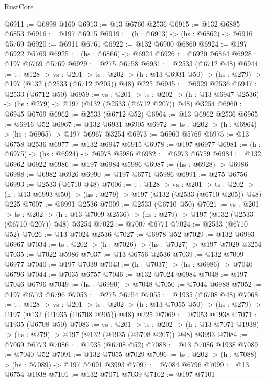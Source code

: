 \begin{lexlean}{RustCore}
\begin{coremodule}
@6911 := @6898 @160
@6913 := @13 @6760 @2536
@6915 := @132 @6885 @6853
@6916 := @197 @6915
@6919 := (h : @6913) -> (hs : @6862) -> @6916 @5769
@6920 := @6911 @6761
@6922 := @132 @6900 @6860
@6924 := @197 @6922 @5769
@6925 := (hs : @6866) -> @6924
@6926 := @6920 @6864
@6928 := @197 @6769 @5769
@6929 := @275 @6758
@6931 := @2533 (@6712 @48)
@6944 := {t : @128} ->
  {vs : @201} ->
  {ts : @202} -> (h : @13 @6931 @50) -> (hs : @279) -> @197 (@132 (@2533 (@6712 @205)) @48) @225
@6945 := @6929 @2536
@6947 := @2533 (@6712 @50)
@6959 := {vs : @201} ->
  {ts : @202} -> (h : @13 @6947 @2536) -> (hs : @279) -> @197 (@132 (@2533 (@6712 @207)) @48) @3254
@6960 := @6945 @6769
@6962 := @2533 (@6712 @52)
@6964 := @13 @6962 @2536
@6965 := @6916 @52
@6967 := @132 @6931 @6905
@6972 := {ts : @202} -> (h : @6964) -> (hs : @6965) -> @197 @6967 @3254
@6973 := @6960 @5769
@6975 := @13 @6758 @2536
@6977 := @132 @6947 @6915
@6978 := @197 @6977
@6981 := (h : @6975) -> (hs : @6924) -> @6978 @5986
@6982 := @6973 @6759
@6984 := @132 @6962 @6922
@6986 := @197 @6984 @5986
@6987 := (hs : @6928) -> @6986
@6988 := @6982 @6926
@6990 := @197 @6771 @5986
@6991 := @275 @6756
@6993 := @2533 (@6710 @48)
@7006 := {t : @128} ->
  {vs : @201} ->
  {ts : @202} -> (h : @13 @6993 @50) -> (hs : @279) -> @197 (@132 (@2533 (@6710 @205)) @48) @225
@7007 := @6991 @2536
@7009 := @2533 (@6710 @50)
@7021 := {vs : @201} ->
  {ts : @202} -> (h : @13 @7009 @2536) -> (hs : @279) -> @197 (@132 (@2533 (@6710 @207)) @48) @3254
@7022 := @7007 @6771
@7024 := @2533 (@6710 @52)
@7026 := @13 @7024 @2536
@7027 := @6978 @52
@7029 := @132 @6993 @6967
@7034 := {ts : @202} -> (h : @7026) -> (hs : @7027) -> @197 @7029 @3254
@7035 := @7022 @5986
@7037 := @13 @6756 @2536
@7039 := @132 @7009 @6977
@7040 := @197 @7039
@7043 := (h : @7037) -> (hs : @6986) -> @7040 @6796
@7044 := @7035 @6757
@7046 := @132 @7024 @6984
@7048 := @197 @7046 @6796
@7049 := (hs : @6990) -> @7048
@7050 := @7044 @6988
@7052 := @197 @6773 @6796
@7053 := @275 @6754
@7055 := @1935 (@6708 @48)
@7068 := {t : @128} ->
  {vs : @201} ->
  {ts : @202} -> (h : @13 @7055 @50) -> (hs : @279) -> @197 (@132 (@1935 (@6708 @205)) @48) @225
@7069 := @7053 @1938
@7071 := @1935 (@6708 @50)
@7083 := {vs : @201} ->
  {ts : @202} -> (h : @13 @7071 @1938) -> (hs : @279) -> @197 (@132 (@1935 (@6708 @207)) @48) @3993
@7084 := @7069 @6773
@7086 := @1935 (@6708 @52)
@7088 := @13 @7086 @1938
@7089 := @7040 @52
@7091 := @132 @7055 @7029
@7096 := {ts : @202} -> (h : @7088) -> (hs : @7089) -> @197 @7091 @3993
@7097 := @7084 @6796
@7099 := @13 @6754 @1938
@7101 := @132 @7071 @7039
@7102 := @197 @7101

\end{coremodule}
\end{lexlean}
